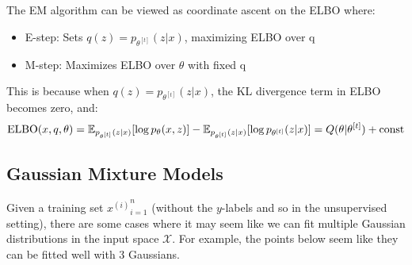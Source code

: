   \begin{corollary}
    The EM algorithm can be viewed as coordinate ascent on the ELBO where:
    \begin{itemize}
      \item E-step: Sets $q(z) = p_{\theta^{[t]}}(z|x)$, maximizing ELBO over q
      \item M-step: Maximizes ELBO over $\theta$ with fixed q
    \end{itemize}
    This is because when $q(z) = p_{\theta^{[t]}}(z|x)$, the KL divergence term in ELBO becomes zero, and:
    \begin{equation}
      \elbo(x, q, \theta) = \mathbb{E}_{p_{\theta^{[t]}}(z|x)}[\log p_\theta(x,z)] - \mathbb{E}_{p_{\theta^{[t]}}(z|x)}[\log p_{\theta^{[t]}}(z|x)] = Q(\theta|\theta^{[t]}) + \text{const}
    \end{equation}
  \end{corollary}

\subsection{Gaussian Mixture Models}

  Given a training set ${x^{(i)}}_{i=1}^n$ (without the $y$-labels and so in the unsupervised setting), there are some cases where it may seem like we can fit multiple Gaussian distributions in the input space $\mathcal{X}$. For example, the points below seem like they can be fitted well with 3 Gaussians.

